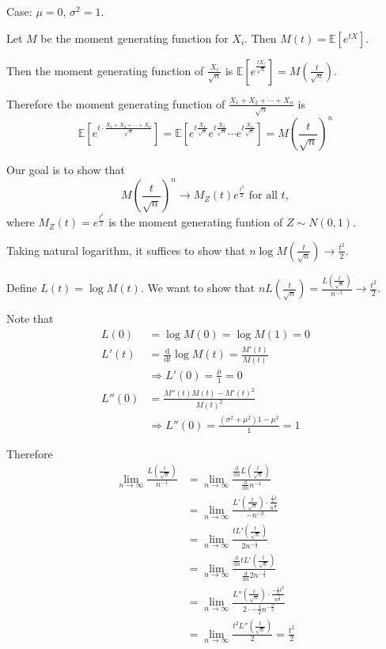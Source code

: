 \documentclass[a4paper,11pt]{amsbook}
\makeatletter
\renewenvironment{proof}[1][\proofname]{\par
    \pushQED{\qed}%
    \normalfont \topsep6\p@\@plus6\p@\relax
    \trivlist
    \itemindent\z@ %
    \item[\hskip\labelsep
          \scshape
      #1\@addpunct{.}]\ignorespaces
}{%
    \popQED\endtrivlist\@endpefalse
}
\theoremstyle{definition}
\theoremstyle{remark}
\newcommand{\E}{\mathbb{E}}
\newcommand\0{\varnothing}
\newcommand\diff[2][]
{
    \frac{\mathrm{d}#1}{\mathrm{d}#2}
}
\makeatother
\begin{document}
\begin{proof}
    Case: $\mu=0$, $\sigma^2=1$.

    Let $M$ be the moment generating function for $X_i$. Then $M(t)=\E[e^{tX}]$.

    Then the moment generating function of $\frac{X_i}{\sqrt{n}}$ is $\E\left[e^{\frac{tX_i}{\sqrt{n}}}\right]=M\left(\frac{t}{\sqrt{n}}\right)$.

    Therefore the moment generating function of $\frac{X_1+X_2+\cdots+X_n}{\sqrt{n}}$ is
    $$\E\left[e^{t\cdot\frac{X_1+X_2+\cdots+X_n}{\sqrt{n}}}\right]=\E\left[e^{t\frac{X_1}{\sqrt{n}}}e^{t\frac{X_2}{\sqrt{n}}}\cdots e^{t\frac{X_n}{\sqrt{n}}}\right]=M\left(\frac{t}{\sqrt{n}}\right)^n$$

    Our goal is to show that $$M\left(\frac{t}{\sqrt{n}}\right)^n\to M_Z(t)e^{\frac{t^2}{2}}\text{ for all }t,$$
    where $M_Z(t)=e^{\frac{t^2}{2}}$ is the moment generating funtion of $Z\sim N(0,1)$.

    Taking natural logarithm, it suffices to show that $n\log M\left(\frac{t}{\sqrt{n}}\right)\to\frac{t^2}{2}$.

    Define $L(t)=\log M(t)$. We want to show that 
    $nL\left(\frac{t}{\sqrt{n}}\right)=\frac{L\left(\frac{t}{\sqrt{n}}\right)}{n^{-1}}\to\frac{t^2}{2}$.

    Note that \begin{align*}
        L(0)&=\log M(0)=\log M(1)=0 \\
        L'(t)&=\diff{t}\log M(t)=\frac{M'(t)}{M(t)} \\
        &\Rightarrow L'(0)=\frac{\mu}{1}=0 \\
        L''(0)&=\frac{M''(t)M(t)-M'(t)^2}{M(t)^2} \\
        &\Rightarrow L''(0)=\frac{(\sigma^2+\mu^2)1-\mu^2}{1}=1
    \end{align*}

    Therefore \begin{align*}
        \lim_{n\to\infty}\frac{L\left(\frac{t}{\sqrt{n}}\right)}{n^{-1}}
        &=\lim_{n\to\infty}\frac{\diff{n}L\left(\frac{t}{\sqrt{n}}\right)}{\diff{n}n^{-1}} \tag{L'Hopital} \\
        &=\lim_{n\to\infty}\frac{L'\left(\frac{t}{\sqrt{n}}\right)\cdot\frac{\frac{1}{2}t}{n^{\frac{3}{2}}}}{-n^{-2}} \\
        &=\lim_{n\to\infty}\frac{tL'\left(\frac{t}{\sqrt{n}}\right)}{2n^{-\frac{1}{2}}} \\
        &=\lim_{n\to\infty}\frac{\diff{n}tL'\left(\frac{t}{\sqrt{n}}\right)}{\diff{n}2n^{-\frac{1}{2}}} \tag{L'Hopital} \\
        &=\lim_{n\to\infty}\frac{L''\left(\frac{t}{\sqrt{n}}\right)\cdot\frac{-\frac{1}{2}t^2}{n^{\frac{3}{2}}}}{2\cdot-\frac{1}{2}n^{-\frac{3}{2}}} \\
        &=\lim_{n\to\infty}\frac{t^2L''\left(\frac{t}{\sqrt{n}}\right)}{2}=\frac{t^2}{2}
    \end{align*}


\end{proof}
\end{document}
